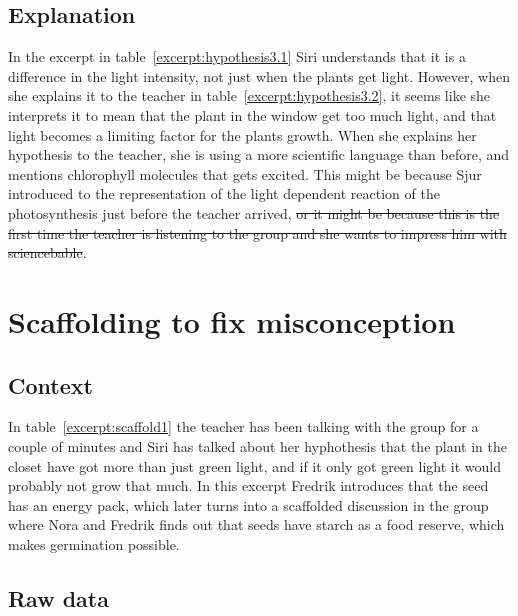 \subsection{Explanation}
In the excerpt in table~\ref{excerpt:hypothesis3.1} Siri understands that it is a difference in the light intensity, not just when the plants get light. However, when she explains it to the teacher in table~\ref{excerpt:hypothesis3.2}, it seems like she interprets it to mean that the plant in the window get too much light, and that light becomes a limiting factor for the plants growth. When she explains her hypothesis to the teacher, she is using a more scientific language than before, and mentions chlorophyll molecules that gets excited. This might be because Sjur introduced to the representation of the light dependent reaction of the photosynthesis just before the teacher arrived, \sout{or it might be because this is the first time the teacher is listening to the group and she wants to impress him with sciencebable}.


\section{Scaffolding to fix misconception}

\subsection{Context}
In table~\ref{excerpt:scaffold1} the teacher has been talking with the group for a couple of minutes and Siri has talked about her hyphothesis that the plant in the closet have got more than just green light, and if it only got green light it would probably not grow that much. In this excerpt Fredrik introduces that the seed has an energy pack, which later turns into a scaffolded discussion in the group where Nora and Fredrik finds out that seeds have starch as a food reserve, which makes germination possible.

\subsection{Raw data}

